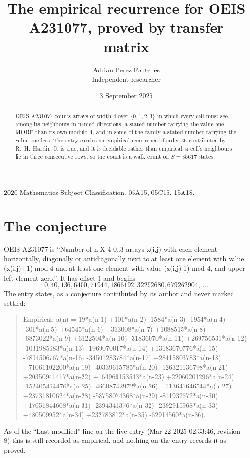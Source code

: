 \documentclass[11pt,a4paper]{article}
\title{The empirical recurrence for OEIS A231077, proved by transfer matrix}
\author{Adrian Perez Fontelles\\ \small Independent researcher}
\date{3 September 2026}
\theoremstyle{plain}
\theoremstyle{definition}
\begin{document}
\maketitle

\begin{abstract}
OEIS A231077 counts arrays of width $4$ over $\{0,1,2,3\}$ in which every cell must see, among its
neighbours in named directions, a stated number carrying the value one MORE than its own
modulo $4$, and in some of the family a stated number carrying the value one less. The entry
carries an empirical recurrence of order $36$ contributed by R.~H.~Hardin. It is true, and
it is decidable rather than empirical: a cell's neighbours lie in three consecutive rows, so
the count is a walk count on $S=35617$ states.
\end{abstract}

\noindent\small 2020 Mathematics Subject Classification. 05A15, 05C15, 15A18.\normalsize

\section{The conjecture}

OEIS A231077 is ``Number of n X 4 0..3 arrays x(i,j) with each element horizontally, diagonally or antidiagonally next to at least one element with value (x(i,j)+1) mod 4 and at least one element with value (x(i,j)-1) mod 4, and upper left element zero.''. It has offset $1$ and begins
\[
0, 40, 136, 6400, 71944, 1866192, 32292680, 679262904,\ \dots
\]
The entry states, as a conjecture contributed by its author and never marked settled:
\begin{quote}
Empirical: a(n) = 19*a(n-1) +101*a(n-2) -1584*a(n-3) -1954*a(n-4) -301*a(n-5) +64545*a(n-6) +333008*a(n-7) +1088515*a(n-8) -6873022*a(n-9) +6122504*a(n-10) -31836070*a(n-11) +269756531*a(n-12) -1031985683*a(n-13) -1969070017*a(n-14) +13183670776*a(n-15) -7804506767*a(n-16) -34501283784*a(n-17) +28415803783*a(n-18) +71061102200*a(n-19) -40339615785*a(n-20) -126321136798*a(n-21) +20350941417*a(n-22) +164969153543*a(n-23) +22060201296*a(n-24) -152405464476*a(n-25) -46608742972*a(n-26) +113641646544*a(n-27) +23731810624*a(n-28) -58758074368*a(n-29) -811932672*a(n-30) +17051844608*a(n-31) -2394341376*a(n-32) -2392915968*a(n-33) +480509952*a(n-34) +232783872*a(n-35) -62914560*a(n-36).
\end{quote}
As of the ``Last modified'' line on the live entry (Mar 22 2025 02:33:46, revision 8) this is still
recorded as empirical, and nothing on the entry records it as proved.
\end{document}
